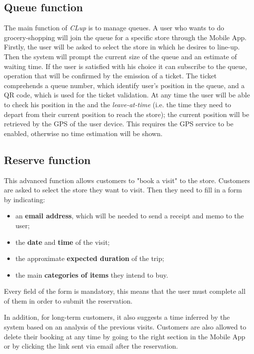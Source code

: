 \subsection{Queue function}
The main function of \textit{CLup} is to manage queues. A user who wants to do grocery-shopping will join the queue for a specific store through the Mobile App.\newline
Firstly, the user will be asked to select the store in which he desires to line-up.\newline
Then the system will prompt the current size of the queue and an estimate of waiting time. If the user is satisfied with his choice it can subscribe to the queue, operation that will be confirmed by the emission of a ticket. The ticket comprehends a queue number, which identify user's position in the queue, and a QR code, which is used for the ticket validation. At any time the user will be able to check his position in the and the \textit{leave-at-time} (i.e. the time they need to depart from their current position to reach the store); the current position will be retrieved by the GPS of the user device. This requires the GPS service to be enabled, otherwise no time estimation will be shown.

\subsection{Reserve function}
This advanced function allows customers to "book a visit" to the store. Customers are asked to select the store they want to visit. Then they need to fill in a form by indicating:
\begin{itemize}
	\item an \textbf{email address}, which will be needed to send a receipt and memo to the user;
	\item the \textbf{date} and \textbf{time} of the visit;
	\item the approximate \textbf{expected duration} of the trip;
 	\item the main \textbf{categories of items} they intend to buy.
\end{itemize}
Every field of the form is mandatory, this means that the user must complete all of them in order to submit the reservation. %

In addition, for long-term customers, it also suggests a time inferred by the system based on an analysis of the previous visits.
Customers are also allowed to delete their booking at any time by going to the right section in the Mobile App or by clicking the link sent via email after the reservation.


